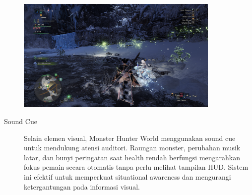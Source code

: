 \documentclass[12pt]{article}
\begin{document}
\begin{description}
\begin{center}
\begin{minipage}{0.45\textwidth}
        \end{minipage}
    \end{center}
    \begin{center}
        \includegraphics[width=0.8\textwidth]{Image/Scoutfly_Trail.png}
    \end{center}

    \item[Sound Cue] Selain elemen visual, Monster Hunter World menggunakan sound cue untuk mendukung atensi auditori.
    Raungan monster, perubahan musik latar, dan bunyi peringatan saat health rendah berfungsi mengarahkan fokus pemain secara otomatis tanpa perlu melihat tampilan HUD.\@
    Sistem ini efektif untuk memperkuat situational awareness dan mengurangi ketergantungan pada informasi visual. 
\end{description}
\end{document}
